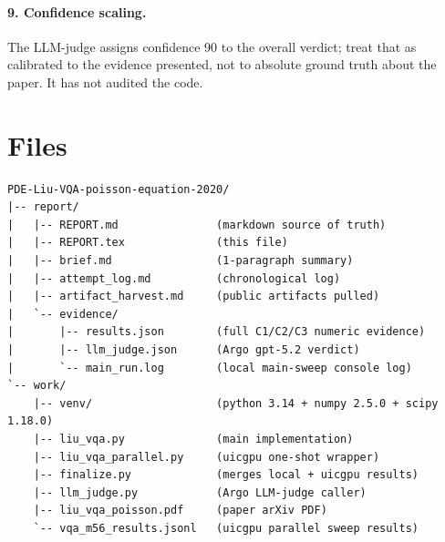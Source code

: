 \documentclass[11pt]{article}
\begin{document}
\paragraph{9. Confidence scaling.} The LLM-judge assigns confidence 90 to the
overall verdict; treat that as calibrated to the evidence presented, not to
absolute ground truth about the paper. It has not audited the code.

\section{Files}
\begin{lstlisting}[basicstyle=\ttfamily\footnotesize,frame=single]
PDE-Liu-VQA-poisson-equation-2020/
|-- report/
|   |-- REPORT.md               (markdown source of truth)
|   |-- REPORT.tex              (this file)
|   |-- brief.md                (1-paragraph summary)
|   |-- attempt_log.md          (chronological log)
|   |-- artifact_harvest.md     (public artifacts pulled)
|   `-- evidence/
|       |-- results.json        (full C1/C2/C3 numeric evidence)
|       |-- llm_judge.json      (Argo gpt-5.2 verdict)
|       `-- main_run.log        (local main-sweep console log)
`-- work/
    |-- venv/                   (python 3.14 + numpy 2.5.0 + scipy 1.18.0)
    |-- liu_vqa.py              (main implementation)
    |-- liu_vqa_parallel.py     (uicgpu one-shot wrapper)
    |-- finalize.py             (merges local + uicgpu results)
    |-- llm_judge.py            (Argo LLM-judge caller)
    |-- liu_vqa_poisson.pdf     (paper arXiv PDF)
    `-- vqa_m56_results.jsonl   (uicgpu parallel sweep results)
\end{lstlisting}
\end{document}
